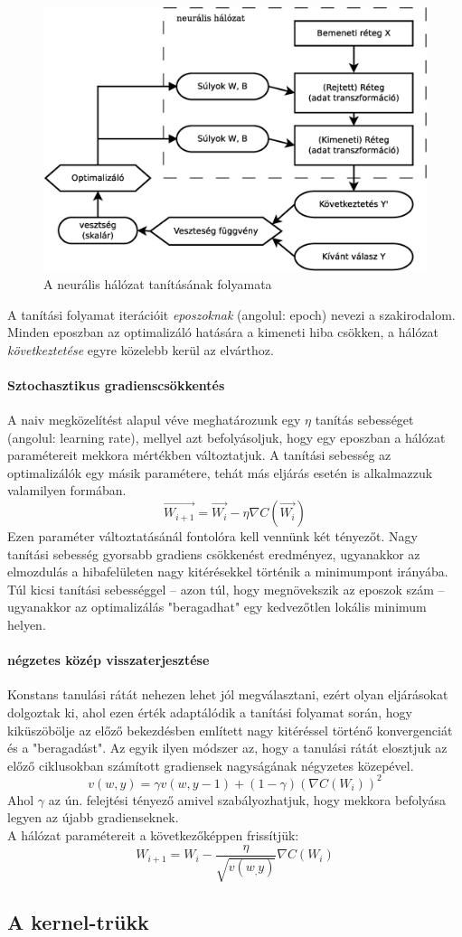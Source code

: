 \begin{figure}[h]
	\centering
	\includegraphics[width=0.7\linewidth]{fig/DNN_dia}
	\caption{A neurális hálózat tanításának folyamata}
	\label{fig:dnn}
\end{figure}

A tanítási folyamat iterációit \emph{eposzoknak} (angolul: epoch) nevezi a szakirodalom. Minden eposzban az optimalizáló hatására a kimeneti hiba csökken, a hálózat \emph{következtetése} egyre közelebb kerül az elvárthoz. 

\paragraph[SGD]{Sztochasztikus gradienscsökkentés}
A naiv megközelítést alapul véve meghatározunk egy $\eta$ tanítás sebességet (angolul: learning rate), mellyel azt befolyásoljuk, hogy egy eposzban a hálózat paramétereit mekkora mértékben változtatjuk. A tanítási sebesség az optimalizálók egy másik paramétere, tehát más eljárás esetén is alkalmazzuk valamilyen formában.
\begin{displaymath}
\vec{W_{i+1}} = \vec{W_i} - \eta\nabla C(\vec{W_i})
\end{displaymath}
Ezen paraméter változtatásánál fontolóra kell vennünk két tényezőt. Nagy tanítási sebesség gyorsabb gradiens csökkenést eredményez, ugyanakkor az elmozdulás a hibafelületen nagy kitérésekkel történik a minimumpont irányába. Túl kicsi tanítási sebességgel -- azon túl, hogy megnövekszik az eposzok szám --  ugyanakkor az optimalizálás "beragadhat" egy kedvezőtlen lokális minimum helyen.

\paragraph[RMSprop]{négzetes közép visszaterjesztése}
Konstans tanulási rátát nehezen lehet jól megválasztani, ezért olyan eljárásokat dolgoztak ki, ahol ezen érték adaptálódik a tanítási folyamat során, hogy kiküszöbölje az előző bekezdésben említett nagy kitéréssel történő konvergenciát és a "beragadást". Az egyik ilyen módszer az, hogy a tanulási rátát elosztjuk az előző ciklusokban számított gradiensek nagyságának négyzetes közepével.
$$ v(w,y) = \gamma v(w,y-1) +(1-\gamma)(\nabla C(W_i))^2 $$
Ahol $\gamma$ az ún. felejtési tényező amivel szabályozhatjuk, hogy mekkora befolyása legyen az újabb gradienseknek.\\
A hálózat paramétereit a következőképpen frissítjük:
$$ W_{i+1} = W_i - \frac{\eta}{\sqrt{v(w_,y)}} \nabla C(W_i) $$


\subsection{A kernel-trükk}


